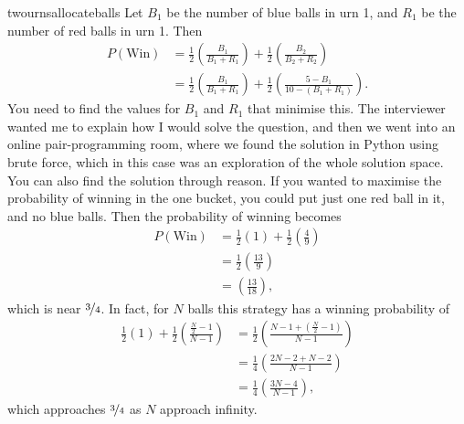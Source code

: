 \begin{answer}{twournsallocateballs}
Let $B_1$ be the number of blue balls in urn 1, and
$R_1$ be the number of red balls in urn 1.
Then
\begin{equation}
\label{eq:urns:crux}
\begin{aligned}
 P(\text{Win})
 &=
  \frac{1}{2}
  \left(
  \frac{B_1}{B_1 + R_1}
  \right)
  +
  \frac{1}{2}
  \left(
  \frac{B_2}{B_2 + R_2}
  \right)
  \\
 &=
  \frac{1}{2}
  \left(
  \frac{B_1}{B_1 + R_1}
  \right)
  +
  \frac{1}{2}
  \left(
  \frac{5 - B_1}{10 - (B_1 +R_1)}
  \right)
  \text{.}
\end{aligned}
\end{equation}
You need to find the values for $B_1$ and $R_1$ that minimise this.
The interviewer wanted me to explain how I would solve the question, and then we went into an online pair-programming room, where we found the solution in Python using brute force, which in this case was an exploration of the whole solution space.
You can also find the solution through reason.
If you wanted to maximise the probability of winning in the one bucket, you could put just one red ball in it, and no blue balls.
Then the probability of winning becomes
\begin{equation*}
\begin{aligned}
 P(\text{Win})
 &=
  \frac{1}{2}
  \left(
  1
  \right)
  +
  \frac{1}{2}
  \left(
  \frac{4}{9}
  \right)
  \\
 &=
  \frac{1}{2}
  \left(
  \frac{13}{9}
  \right)
  \\
 &=
  \left(
  \frac{13}{18}
  \right)
  \text{,}
\end{aligned}
\end{equation*}
which is near $\nicefrac{3}{4}$.
In fact, for $N$ balls this strategy has a winning probability of
\begin{align*}
  \frac{1}{2}
  \left(
  1
  \right)
  +
  \frac{1}{2}
  \left(
  \frac{\frac{N}{2} - 1}{N - 1}
  \right)
  &=
  \frac{1}{2}
  \left(
  \frac{ N-1 + \left( \frac{N}{2} - 1 \right) }{N - 1}
  \right)
  \\
  &=
  \frac{1}{4}
  \left(
  \frac{ 2N-2 +  N - 2  }{N - 1}
  \right)
  \\
  &=
  \frac{1}{4}
  \left(
  \frac{ 3N - 4  }{N - 1}
  \right)
  \text{,}
\end{align*}
which approaches $\nicefrac{3}{4}$ as $N$ approach infinity.


\end{answer}
